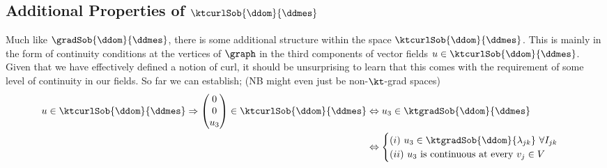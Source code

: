 \subsection{Additional Properties of $\ktcurlSob{\ddom}{\ddmes}$} \label{sec:ktcurlSobExtraProperties}
Much like $\gradSob{\ddom}{\ddmes}$, there is some additional structure within the space $\ktcurlSob{\ddom}{\ddmes}$.
This is mainly in the form of continuity conditions at the vertices of $\graph$ in the third components of vector fields $u\in\ktcurlSob{\ddom}{\ddmes}$.
Given that we have effectively defined a notion of curl, it should be unsurprising to learn that this comes with the requirement of some level of continuity in our fields.
So far we can establish; (NB might even just be non-$\kt$-grad spaces)
\begin{align*}
	u\in\ktcurlSob{\ddom}{\ddmes} \Rightarrow
	\begin{pmatrix} 0 \\ 0 \\ u_3 \end{pmatrix}\in\ktcurlSob{\ddom}{\ddmes} &\Leftrightarrow 
	u_3\in\ktgradSob{\ddom}{\ddmes} \\
	&\Leftrightarrow	\begin{cases} (i) \ u_3\in\ktgradSob{\ddom}{\lambda_{jk}} \ \forall I_{jk} \\ (ii) \ u_3 \text{ is continuous at every } v_j\in V	\end{cases}
\end{align*}

